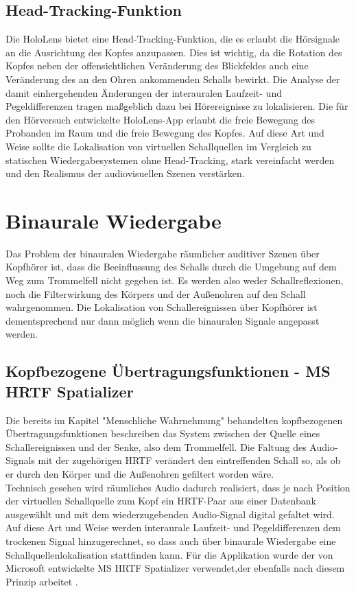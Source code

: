 \subsection{Head-Tracking-Funktion}
Die HoloLens bietet eine Head-Tracking-Funktion, die es erlaubt die Hörsignale an die Ausrichtung des Kopfes anzupassen. Dies ist wichtig, da die Rotation des Kopfes neben der offensichtlichen Veränderung des Blickfeldes auch eine Veränderung des an den Ohren ankommenden Schalls bewirkt. Die Analyse der damit einhergehenden Änderungen der interauralen Laufzeit- und Pegeldifferenzen tragen maßgeblich dazu bei Hörereignisse zu lokalisieren. Die für den Hörversuch entwickelte HoloLens-App erlaubt die freie Bewegung des Probanden im Raum und die freie Bewegung des Kopfes. Auf diese Art und Weise sollte die Lokalisation von virtuellen Schallquellen im Vergleich zu statischen Wiedergabesystemen ohne Head-Tracking, stark vereinfacht werden und den Realismus der audiovisuellen Szenen verstärken.  
  
\section{Binaurale Wiedergabe}
 Das Problem der binauralen Wiedergabe räumlicher auditiver Szenen über Kopfhörer ist, dass die Beeinflussung des Schalls durch die Umgebung auf dem Weg zum Trommelfell nicht gegeben ist. Es werden also weder Schallreflexionen, noch die Filterwirkung des Körpers und der Außenohren auf den Schall wahrgenommen. Die Lokalisation von Schallereignissen über Kopfhörer ist dementsprechend nur dann möglich wenn die binauralen Signale angepasst werden. 
 
 \subsection{Kopfbezogene Übertragungsfunktionen - MS HRTF Spatializer}
 
 Die bereits im Kapitel "Menschliche Wahrnehmung" behandelten kopfbezogenen Übertragungsfunktionen beschreiben das System zwischen der Quelle eines Schallereignissen und der Senke, also dem Trommelfell. Die Faltung des Audio-Signals mit der zugehörigen HRTF verändert den eintreffenden Schall so, als ob er durch den Körper und die Außenohren gefiltert worden wäre. \\
 
 Technisch gesehen wird räumliches Audio dadurch realisiert, dass je nach Position der virtuellen Schallquelle zum Kopf ein HRTF-Paar aus einer Datenbank ausgewählt und mit dem wiederzugebenden Audio-Signal digital gefaltet wird. Auf diese Art und Weise werden interaurale Laufzeit- und Pegeldifferenzen dem trockenen Signal hinzugerechnet, so  dass auch über  binaurale Wiedergabe eine Schallquellenlokalisation stattfinden kann. Für die Applikation wurde der von Microsoft entwickelte MS HRTF Spatializer verwendet,der ebenfalls nach diesem Prinzip arbeitet \cite{MSHRTF}.
 

